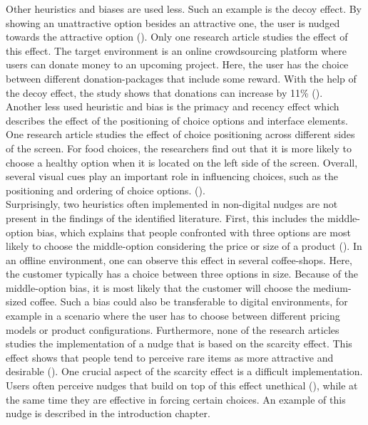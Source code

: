Other heuristics and biases are used less. Such an example is the decoy effect. By showing an unattractive option besides an attractive one, the user is nudged towards the attractive option (\cite{schneider_digital_2018}). Only one research article studies the effect of this effect. The target environment is an online crowdsourcing platform where users can donate money to an upcoming project. Here, the user has the choice between different donation-packages that include some reward. With the help of the decoy effect, the study shows that donations can increase by 11\% (\cite{tietz_decoy_2016}).
\\

Another less used heuristic and bias is the primacy and recency effect which describes the effect of the positioning of choice options and interface elements. One research article studies the effect of choice positioning across different sides of the screen. For food choices, the researchers find out that it is more likely to choose a healthy option when it is located on the left side of the screen. Overall, several visual cues play an important role in influencing choices, such as the positioning and ordering of choice options. (\cite{romero_healthy-left_2016}).
\\

Surprisingly, two heuristics often implemented in non-digital nudges are not present in the findings of the identified literature. First, this includes the middle-option bias, which explains that people confronted with three options are most likely to choose the middle-option considering the price or size of a product (\cite{schneider_digital_2018}). In an offline environment, one can observe this effect in several coffee-shops. Here, the customer typically has a choice between three options in size. Because of the middle-option bias, it is most likely that the customer will choose the medium-sized coffee. Such a bias could also be transferable to digital environments, for example in a scenario where the user has to choose between different pricing models or product configurations. 
Furthermore, none of the research articles studies the implementation of a nudge that is based on the scarcity effect. This effect shows that people tend to perceive rare items as more attractive and desirable (\cite{gergen_search_1980}). One crucial aspect of the scarcity effect is a difficult implementation. Users often perceive nudges that build on top of this effect unethical (\cite{sunstein_nudging_2015}), while at the same time they are effective in forcing certain choices. An example of this nudge is described in the introduction chapter.
\\

